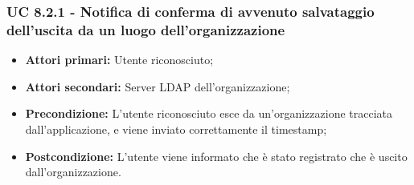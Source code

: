 \subsubsection{UC 8.2.1 - Notifica di conferma di avvenuto salvataggio dell'uscita da un luogo dell'organizzazione}%
\begin{itemize}
	\item \textbf{Attori primari:} Utente riconosciuto;
	\item \textbf{Attori secondari:} Server LDAP dell'organizzazione;
	\item \textbf{Precondizione:} L'utente riconosciuto esce da un'organizzazione tracciata dall'applicazione, e viene  inviato correttamente il timestamp;
	\item \textbf{Postcondizione:} L'utente viene informato che è stato registrato che è uscito dall'organizzazione.
\end{itemize}

